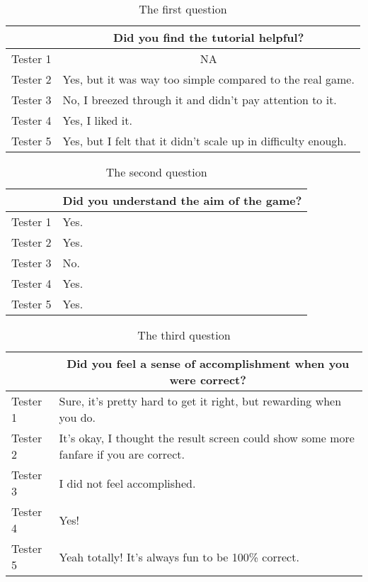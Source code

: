 \begin{table}[H]
\centering
\caption{The first question}
\label{tab:question1}
\begin{tabular}{p{1.3cm}p{10cm}}
\toprule
 & \multicolumn{1}{c}{Did you find the tutorial helpful?} \\ \midrule
Tester 1 & \multicolumn{1}{c}{NA} \\
Tester 2 & Yes, but it was way too simple compared to the real game. \\
Tester 3 & No, I breezed through it and didn't pay attention to it. \\
Tester 4 & Yes, I liked it. \\
Tester 5 & Yes, but I felt that it didn't scale up in difficulty enough. \\ \bottomrule
\end{tabular}
\end{table}

\begin{table}[H]
\centering
\caption{The second question}
\label{tab:question2}
\begin{tabular}{p{1.3cm}p{10cm}}
\toprule
 & \multicolumn{1}{c}{Did you understand the aim of the game?} \\ \midrule
Tester 1 & Yes. \\
Tester 2 & Yes. \\
Tester 3 & No. \\
Tester 4 & Yes. \\
Tester 5 & Yes. \\ \bottomrule
\end{tabular}
\end{table}

\begin{table}[H]
\centering
\caption{The third question}
\label{tab:question3}
\begin{tabular}{p{1.3cm}p{10cm}}
\toprule
 & \multicolumn{1}{c}{Did you feel a sense of accomplishment when you were correct?} \\ \midrule
Tester 1 & Sure, it's pretty hard to get it right, but rewarding when you do. \\
Tester 2 & It's okay, I thought the result screen could show some more fanfare if you are correct. \\
Tester 3 & I did not feel accomplished. \\
Tester 4 & Yes! \\
Tester 5 & Yeah totally! It's always fun to be 100\% correct. \\ \bottomrule
\end{tabular}
\end{table}

